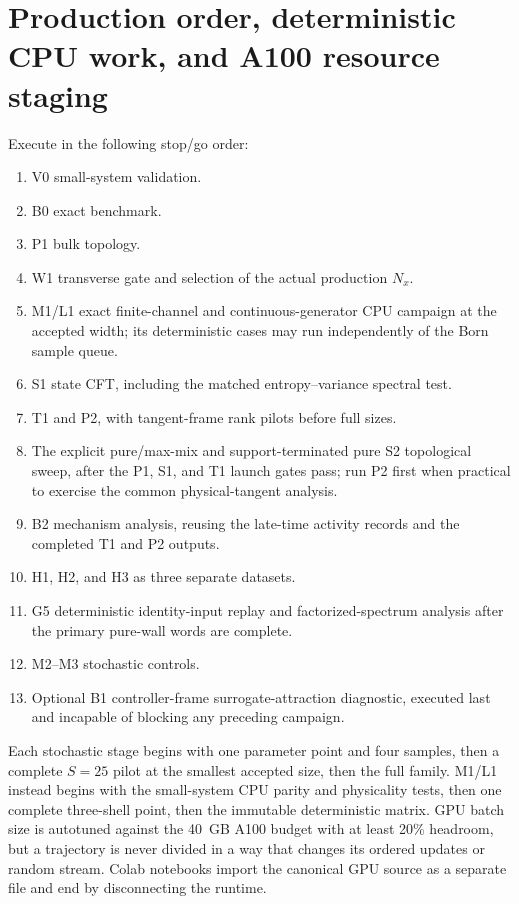 \documentclass[aps,prx,twocolumn,floatfix,nofootinbib,superscriptaddress,longbibliography]{revtex4-2}
\begin{document}
\section{Production order, deterministic CPU work, and A100 resource staging}

Execute in the following stop/go order:
\begin{enumerate}
\item V0 small-system validation.
\item B0 exact benchmark.
\item P1 bulk topology.
\item W1 transverse gate and selection of the actual production $N_x$.
\item M1/L1 exact finite-channel and continuous-generator CPU campaign at the accepted
      width; its deterministic cases may run independently of the Born sample queue.
\item S1 state CFT, including the matched entropy--variance spectral test.
\item T1 and P2, with tangent-frame rank pilots before full sizes.
\item The explicit pure/max-mix and support-terminated pure S2 topological sweep, after the P1, S1, and T1 launch gates
      pass; run P2 first when practical to exercise the common physical-tangent analysis.
\item B2 mechanism analysis, reusing the late-time activity records and the completed T1
and P2 outputs.
\item H1, H2, and H3 as three separate datasets.
\item G5 deterministic identity-input replay and factorized-spectrum analysis after the
      primary pure-wall words are complete.
\item M2--M3 stochastic controls.
\item Optional B1 controller-frame surrogate-attraction diagnostic, executed last and
      incapable of blocking any preceding campaign.
\end{enumerate}
Each stochastic stage begins with one parameter point and four samples, then a complete
$S=25$ pilot at the smallest accepted size, then the full family.  M1/L1 instead begins
with the small-system CPU parity and physicality tests, then one complete three-shell
point, then the immutable deterministic matrix.  GPU batch size is autotuned against the
40~GB A100 budget with at least 20\% headroom, but a trajectory is never divided in a way
that changes its ordered updates or random stream.  Colab notebooks import the canonical
GPU source as a separate file and end by disconnecting the runtime.
\end{document}
